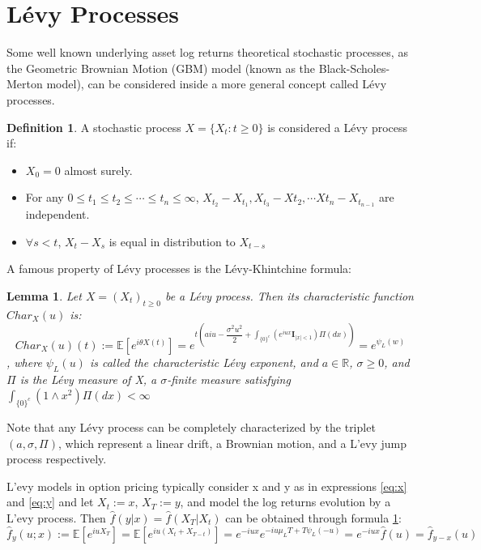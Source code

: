 \documentclass[12,twoside]{mammeTFM}
\newtheorem{lem}[thm]{Lemma}
\theoremstyle{definition}
\newtheorem{definition}[thm]{Definition}
\theoremstyle{remark}
\newcommand{\E}{\ensuremath{\mathbb{E}}}
\newcommand{\R}{\ensuremath{\mathbb{R}}}
\begin{document}
\section{L\'evy Processes}\label{chapter:levy}
Some well known underlying asset log returns theoretical stochastic processes, as the Geometric Brownian Motion (GBM) model (known as the Black-Scholes-Merton\cite{bs73, mer73} model), can be considered inside a more general concept called L\'evy processes.

\begin{definition} A stochastic process $X = \{X_t : t \geq 0\}$ is considered a L\'evy process if:
\begin{itemize}
\item $X_0 = 0$ almost surely.
\item For any $0 \leq t_1 \leq t_2 \leq \cdots \leq t_n \leq \infty$, $X_{t_2} - X_{t_1}, X_{t_3} - X{t_2}, \cdots X{t_n} - X_{t_{n-1}}$ are independent.
\item $\forall s < t$, $X_t - X_s$ is equal in distribution to $X_{t-s}$
\end{itemize}
\end{definition}

A famous property of L\'evy processes is the L\'evy-Khintchine formula:
\begin{lem}\label{levy_khin} Let $X = (X_t)_{t\geq 0}$ be a L\'evy process. Then its characteristic function $Char_X(u)$ is:
$$
Char_X(u)(t) := \E \left[e^{i\theta X(t)}\right] = e^{t\left(aiu - \dfrac{\sigma^2 u^2}{2} + \int_{\{0\}^c}(e^{iu x} \textbf{I}_{|x| < 1})\Pi(dx)\right)} = e^{\psi_L(w)}
$$
, where $\psi_L(u)$ is called the characteristic L\'evy exponent, and $a \in \R$, $\sigma \geq 0$, and $\Pi$ is the L\'evy measure of X, a $\sigma$-finite measure satisfying $\int_{\{0\} ^c}(1 \wedge x^2)\Pi (dx) < \infty$
\end{lem}

Note that any L\'evy process can be completely characterized by the triplet $(a, \sigma, \Pi)$, which represent a linear drift, a Brownian motion, and a L'evy jump process respectively.

L'evy models in option pricing typically consider x and y as in expressions \ref{eq:x} and \ref{eq:y} and let $X_t := x$, $X_T := y$, and model the log returns evolution by a L'evy process. Then $\hat{f}(y|x) = \hat{f}(X_T|X_t)$ can be obtained through formula \ref{levy_khin}:
\begin{equation}\label{eq:levy_char}
\hat{f}_{y}(u; x) := 
\E\left[e^{iu X_T}\right] = 
\E\left[e^{iu (X_t + X_{T-t})}\right] = 
e^{-iu x}e^{-i u \mu_L T + T \psi_L(-u)} = 
e^{-iu x}\hat{f}(u) = 
\hat{f}_{y - x}(u)
\end{equation}
\end{document}
